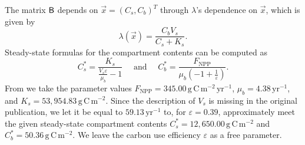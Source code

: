 \documentclass[smallextended]{svjour3}
\newcommand{\gC}{\mathrm{g\,C}}
\newcommand{\yr}{\mathrm{yr}}
\newcommand{\meter}{\mathrm{m}}
\newcommand{\transpose}{T}
\newcommand{\NPP}{\ensuremath{\mathrm{NPP}}}
\begin{document}
The matrix $\mathsf{B}$ depends on $\vec{x}=(C_{s},C_{b})^{\transpose}$ through $\lambda$'s dependence on $\vec{x}$, which is given by
\begin{equation}\label{eqn:lambdax}
    \lambda(\vec{x}) = \frac{C_{b} V_{s}}{C_{s} + K_{s}}.
\end{equation}
Steady-state formulas for the compartment contents can be computed as
\begin{equation*}
    C_s^\ast = \frac{K_{s}}{\frac{V_{s} \varepsilon}{\mu_{b}} - 1}\quad\text{ and }\quad C_b^\ast = \frac{F_{\NPP}}{\mu_{b} \left(-1 + \frac{1}{\varepsilon}\right)}.
	\end{equation*}
From \citet{Wang2014BG} we take the parameter values $F_{\NPP} = 345.00\,\gC\,\meter^{-2}\,\yr^{-1}$, $\mu_b = 4.38\,\yr^{-1}$, and $K_s = 53,954.83\,\gC\,\meter^{-2}$.
Since the description of $V_s$ is missing in the original publication, we let it be equal to $59.13\,\yr^{-1}$ to, for $\varepsilon=0.39$, approximately meet the given steady-state compartment contents $C_s^\ast = 12,650.00\,\gC\,\meter^{-2}$ and $C_b^\ast = 50.36\,\gC\,\meter^{-2}$.
We leave the carbon use efficiency $\varepsilon$ as a free parameter.
\end{document}
